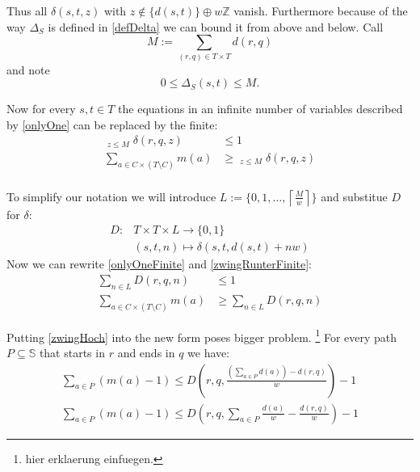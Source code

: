\documentclass[a4paper]{amsart} %
\newcommand{\todo}[1]{\footnote{#1}}
\begin{document}
Thus all \(\delta (s, t, z)\) with \(z \notin \{d (s,t)\} \oplus w
\mathbb{Z}\) vanish.  Furthermore because of the way \(\Delta_S\) is
defined in \ref{defDelta} we can bound it from above and below. Call
\[M := \sum_{(r,q) \in T \times T} d (r,q)\]
and note
\[0 \leq \Delta_S(s,t) \leq M \textrm{.}\]


Now for every \(s,t \in T\) the equations in an infinite number of
variables described by \ref{onlyOne} can be replaced by the finite:
\begin{align}
  \label{onlyOneFinite}
  \mathop{\sum_{z \in \left\{d (s,t)\right\} \oplus w \mathbb{N}_0}}_{z\leq M} \delta(r, q, z) & \leq 1 \\
  \label{zwingRunterFinite}
  \sum_{a \in C \times (T \setminus C)} m(a) & \geq \mathop{\sum_{z \in \left\{d (s,t)\right\} \oplus w \mathbb{N}_0}}_{z\leq M} \delta (r,q, z) \\
\end{align}

To simplify our notation we will introduce \(L := \{0, 1, \dots,
\left\lceil \frac{M}{w} \right\rceil \}\) and substitue \(D\) for
\(\delta\):
\begin{align}
  D \colon & T \times T \times L  \to \{0,1\} \\
          & (s,       t,        n)                              \mapsto \delta (s,t, d(s,t) + n w)
\end{align}
Now we can rewrite \ref{onlyOneFinite} and \ref{zwingRunterFinite}:
\begin{align}
  \label{onlyOneFiniteN}
  \sum_{n \in L} D (r, q, n) & \leq 1 \\
  \label{zwingRunterFiniteN}
  \sum_{a \in C \times (T \setminus C)} m(a) & \geq \sum_{n \in L} D (r,q, n)
\end{align}

Putting \ref{zwingHoch} into the new form poses bigger
problem. \todo{hier erklaerung einfuegen.}  For every path \(P
\subseteq \mathbb{S}\) that starts in \(r\) and ends in \(q\) we have:
\begin{align}
\sum_{a \in P} (m(a) - 1) \leq D \left(r,q, \frac{\left(\sum_{a \in P} d \left(a\right)\right) -d(r,q)}{w}\right) - 1  \\
\label{zwingHochFiniteN}
\sum_{a \in P} (m(a) - 1) \leq D \left(r,q, \sum_{a \in P} \frac{ d \left(a\right)}{w} - \frac{d(r,q)}{w}\right) - 1
\end{align}
\end{document}
